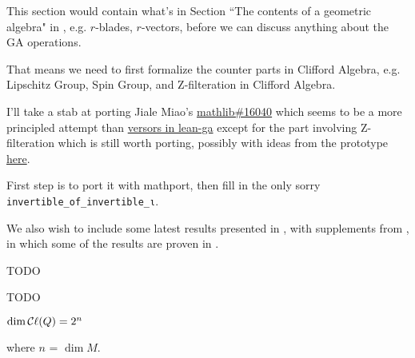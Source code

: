 This section would contain what's in Section ``The contents of a geometric algebra" in \cite{chisolm2012geometric}, e.g. $r$-blades, $r$-vectors, before we can discuss anything about the GA operations.

That means we need to first formalize the counter parts in Clifford Algebra, e.g. Lipschitz Group, Spin Group, and Z-filteration in Clifford Algebra.

I'll take a stab at porting Jiale Miao's \href{https://github.com/leanprover-community/mathlib/pull/16040}{mathlib\#16040} which seems to be a more principled attempt than \href{https://github.com/pygae/lean-ga/blob/master/src/geometric_algebra/from_mathlib/versors.lean}{versors in lean-ga} except for the part involving Z-filteration which is still worth porting, possibly with ideas from the prototype \href{https://github.com/eric-wieser/lftcm2023-clifford_algebra/}{here}.

First step is to port it with mathport, then fill in the only sorry \lstinline|invertible_of_invertible_ι|.

We also wish to include some latest results presented in \cite{ruhe2023clifford}, with supplements from \cite{brehmer2023geometric},
in which some of the results are proven in \cite{roelfs2023graded}.

\begin{definition}
    \label{Lipschitz}
    \tangled

    TODO

\end{definition}

\begin{definition}
    \label{SpinGroup}
    \tangled

    TODO

\end{definition}

\begin{theorem}
    \label{dim}
    \tangled

    $\dim \mathop{\mathcal{C}\ell}(Q) = 2^n$

    where $n$ = $\dim M$.

\end{theorem}